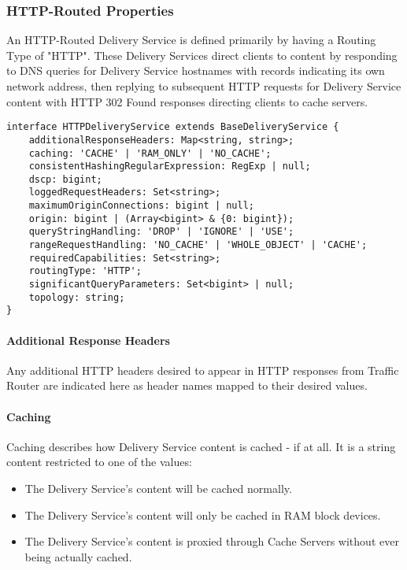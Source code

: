 \subsubsection{HTTP-Routed Properties}
An HTTP-Routed Delivery Service is defined primarily by having a Routing Type of
"HTTP". These Delivery Services direct clients to content by responding to DNS
queries for Delivery Service hostnames with records indicating its own network
address, then replying to subsequent HTTP requests for Delivery Service content
with HTTP 302 Found responses directing clients to cache servers.

\begin{codelisting}
\begin{verbatim}
interface HTTPDeliveryService extends BaseDeliveryService {
	additionalResponseHeaders: Map<string, string>;
	caching: 'CACHE' | 'RAM_ONLY' | 'NO_CACHE';
	consistentHashingRegularExpression: RegExp | null;
	dscp: bigint;
	loggedRequestHeaders: Set<string>;
	maximumOriginConnections: bigint | null;
	origin: bigint | (Array<bigint> & {0: bigint});
	queryStringHandling: 'DROP' | 'IGNORE' | 'USE';
	rangeRequestHandling: 'NO_CACHE' | 'WHOLE_OBJECT' | 'CACHE';
	requiredCapabilities: Set<string>;
	routingType: 'HTTP';
	significantQueryParameters: Set<bigint> | null;
	topology: string;
}
\end{verbatim}
\end{codelisting}

\paragraph{Additional Response Headers}
Any additional HTTP headers desired to appear in HTTP responses from Traffic
Router are indicated here as header names mapped to their desired values.

\paragraph{Caching}
Caching describes how Delivery Service content is cached - if at all. It is a
string content restricted to one of the values:

\begin{itemize}
	\item {} The Delivery Service's content will be cached normally.
	\item {} The Delivery Service's content will only be cached
	in RAM block devices.
	\item {} The Delivery Service's content is proxied through
	Cache Servers without ever being actually cached.
\end{itemize}


